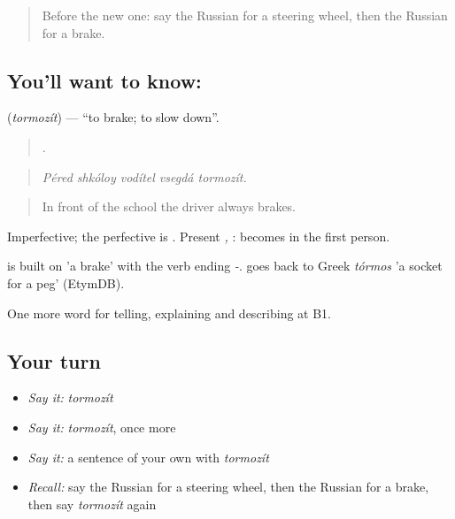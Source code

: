 \label{lesson:RU-C403-tormozit}



\begin{quote}
Before the new one: say the Russian for a steering wheel, then the Russian for a brake.
\end{quote}

\subsection*{You'll want to know: }
\textbf{} (\emph{tormozít}) — \textquotedblleft{}to brake; to slow down\textquotedblright{}.

\begin{quote}
    .
\end{quote}

\begin{quote}
\emph{Péred shkóloy vodítel vsegdá tormozít.}
\end{quote}

\begin{quote}
In front of the school the driver always brakes.
\end{quote}

Imperfective; the perfective is \emph{}. Present \emph{, }:  becomes  in the first person.

\begin{cousinweb}
\emph{} is built on \emph{} 'a brake' with the verb ending \emph{-}. \emph{} goes back to Greek \emph{tórmos} 'a socket for a peg' (EtymDB).
\end{cousinweb}

\begin{grammarlens}[title={What you've built}]
One more word for telling, explaining and describing at B1.
\end{grammarlens}

\subsection*{Your turn}
\begin{itemize}
\raggedright
  \item \emph{Say it:} \emph{tormozít}
  \item \emph{Say it:} \emph{tormozít}, once more
  \item \emph{Say it:} a sentence of your own with \emph{tormozít}
  \item \emph{Recall:} say the Russian for a steering wheel, then the Russian for a brake, then say \emph{tormozít} again
\end{itemize}


